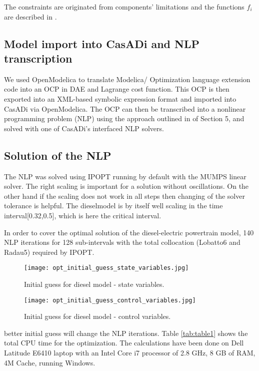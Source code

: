 The constraints are originated from components’ limitations and the functions $ f_i$  are described in \cite{sivertsson}.

\subsection{Model import into CasADi and NLP transcription}
\label{sec:optimizationxmlimport}

We used OpenModelica to translate Modelica/ Optimization
language extension code into an OCP in DAE and Lagrange
cost function. This OCP is then exported into an XML-based
symbolic expression format and imported into CasADi via
OpenModelica. The OCP can then be transcribed into a
nonlinear programming problem (NLP) using the approach
outlined in \cite{bernhard} of Section 5, and solved with one of CasADi’s interfaced NLP solvers.

\subsection{Solution of the NLP}
\label{sec:optimizationnlp}

The NLP was solved using IPOPT \cite{wachter} running by default with the MUMPS linear solver.
The right scaling is important for a solution without oscillations.
On the other hand if the scaling does not work in all steps
then changing of the solver tolerance is helpful. The dieselmodel
is by itself well scaling in the time interval[0.32,0.5],
which is here the critical interval.

In order to cover the optimal solution of the diesel-electric
powertrain model, 140 NLP iterations for 128 sub-intervals
with the total collocation (Lobatto6 and Radau5) required by
IPOPT.

\begin{figure}
	\texttt{[image: opt\_initial\_guess\_state\_variables.jpg]}
	\caption{Initial guess for diesel model - state variables.}
	\label{fig:initialguessstatevariables}
\end{figure}

\begin{figure}
	\texttt{[image: opt\_initial\_guess\_control\_variables.jpg]}
	\caption{Initial guess for diesel model - control variables.}
	\label{fig:initialguesscontrolvariables}
\end{figure}


better initial guess will change the NLP iterations.
Table \ref{tab:table1} shows the total CPU time for the optimization. The calculations have been done on Dell Latitude E6410 laptop
with an Intel Core i7 processor of 2.8 GHz, 8 GB of RAM, 4M Cache, running Windows.

